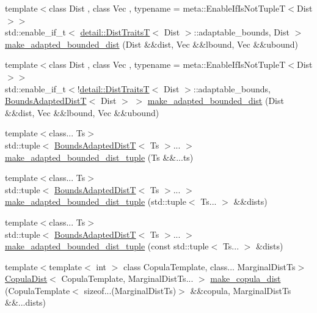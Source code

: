 \begin{DoxyCompactItemize}
\item 
{\footnotesize template$<$class Dist , class Vec , typename  = meta\+::\+Enable\+If\+Is\+Not\+Tuple\+T$<$\+Dist$>$$>$ }\\std\+::enable\+\_\+if\+\_\+t$<$ \hyperlink{namespaceprior__hessian_1_1detail_a00684f44608e5a5bf76458d81159f924}{detail\+::\+Dist\+TraitsT}$<$ Dist $>$\+::adaptable\+\_\+bounds, Dist $>$ \hyperlink{namespaceprior__hessian_ace3ed32ae08101fa6cddfb56cc39f3a9}{make\+\_\+adapted\+\_\+bounded\+\_\+dist} (Dist \&\&dist, Vec \&\&lbound, Vec \&\&ubound)
\item 
{\footnotesize template$<$class Dist , class Vec , typename  = meta\+::\+Enable\+If\+Is\+Not\+Tuple\+T$<$\+Dist$>$$>$ }\\std\+::enable\+\_\+if\+\_\+t$<$!\hyperlink{namespaceprior__hessian_1_1detail_a00684f44608e5a5bf76458d81159f924}{detail\+::\+Dist\+TraitsT}$<$ Dist $>$\+::adaptable\+\_\+bounds, \hyperlink{namespaceprior__hessian_a919f0d7f51ea845224ca7f03983508a9}{Bounds\+Adapted\+DistT}$<$ Dist $>$ $>$ \hyperlink{namespaceprior__hessian_ab331d08c528526111610cf1407ca43c1}{make\+\_\+adapted\+\_\+bounded\+\_\+dist} (Dist \&\&dist, Vec \&\&lbound, Vec \&\&ubound)
\item 
{\footnotesize template$<$class... Ts$>$ }\\std\+::tuple$<$ \hyperlink{namespaceprior__hessian_a919f0d7f51ea845224ca7f03983508a9}{Bounds\+Adapted\+DistT}$<$ Ts $>$... $>$ \hyperlink{namespaceprior__hessian_a55f558964ebfac8734141e232a376bb7}{make\+\_\+adapted\+\_\+bounded\+\_\+dist\+\_\+tuple} (Ts \&\&...ts)
\item 
{\footnotesize template$<$class... Ts$>$ }\\std\+::tuple$<$ \hyperlink{namespaceprior__hessian_a919f0d7f51ea845224ca7f03983508a9}{Bounds\+Adapted\+DistT}$<$ Ts $>$... $>$ \hyperlink{namespaceprior__hessian_a95fddb21432915b6b47579b4ad05602f}{make\+\_\+adapted\+\_\+bounded\+\_\+dist\+\_\+tuple} (std\+::tuple$<$ Ts... $>$ \&\&dists)
\item 
{\footnotesize template$<$class... Ts$>$ }\\std\+::tuple$<$ \hyperlink{namespaceprior__hessian_a919f0d7f51ea845224ca7f03983508a9}{Bounds\+Adapted\+DistT}$<$ Ts $>$... $>$ \hyperlink{namespaceprior__hessian_a277a764f9d5df7ff208e9052de05f067}{make\+\_\+adapted\+\_\+bounded\+\_\+dist\+\_\+tuple} (const std\+::tuple$<$ Ts... $>$ \&dists)
\item 
{\footnotesize template$<$template$<$ int $>$ class Copula\+Template, class... Marginal\+Dist\+Ts$>$ }\\\hyperlink{namespaceprior__hessian_a40a0589f5be3c61e4c4854fcefe8855f}{Copula\+Dist}$<$ Copula\+Template, Marginal\+Dist\+Ts... $>$ \hyperlink{namespaceprior__hessian_a0cfb582e76e0bbae3498707a8458cb78}{make\+\_\+copula\+\_\+dist} (Copula\+Template$<$ sizeof...(Marginal\+Dist\+Ts)$>$ \&\&copula, Marginal\+Dist\+Ts \&\&...dists)

\end{DoxyCompactItemize}
